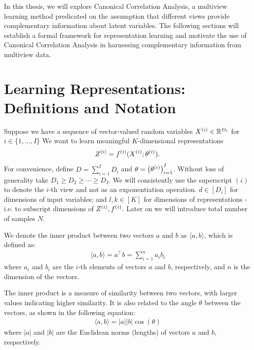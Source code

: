 In this thesis, we will explore Canonical Correlation Analysis, a multiview learning method predicated on the assumption that different \gls{views} provide complementary information about latent variables. The following sections will establish a formal framework for representation learning and motivate the use of Canonical Correlation Analysis in harnessing complementary information from multiview data.

\section{Learning Representations: Definitions and Notation}

Suppose we have a sequence of vector-valued random variables $X^{(i)} \in \mathbb{R}^{D_i}$ for $i \in \{1, \dots, I \}$
We want to learn meaningful $K$-dimensional \gls{representations}
\begin{equation}
    \label{eq:general-form-of-representations}
    Z^{(i)} = f^{(i)}( X^{(i)}; \theta^{(i)}).
\end{equation}
For convenience, define $D = \sum_{i=1}^I D_i$ and $\theta = \left(\theta^{(i)}\right)_{i=1}^I$.
Without loss of generality take $D_1 \geq D_2 \geq \cdots \geq D_I$.
We will consistently use the superscript $(i)$ to denote the $i$-th view and not as an exponentiation operation.
$d \in [D_i]$ for dimensions of input variables;
and $l,k \in [K]$ for dimensions of \gls{representations} - i.e. to subscript dimensions of $Z^{(i)}, f^{(i)}$.
Later on we will introduce total number of samples $N$.

We denote the inner product between two vectors $a$ and $b$ as $\langle a, b \rangle$, which is defined as:
\begin{align}
\label{eq:inner-product}
\langle a, b \rangle = a^\top b = \sum_{i=1}^n a_i b_i
\end{align}
where $a_i$ and $b_i$ are the $i$-th elements of vectors $a$ and $b$, respectively, and $n$ is the dimension of the vectors.

The inner product is a measure of similarity between two vectors, with larger values indicating higher similarity. It is also related to the angle $\theta$ between the vectors, as shown in the following equation:
\begin{align}
\label{eq:inner-product-angle}
\langle a, b \rangle = |a| |b| \cos(\theta)
\end{align}
where $|a|$ and $|b|$ are the Euclidean norms (lengths) of vectors $a$ and $b$, respectively.

